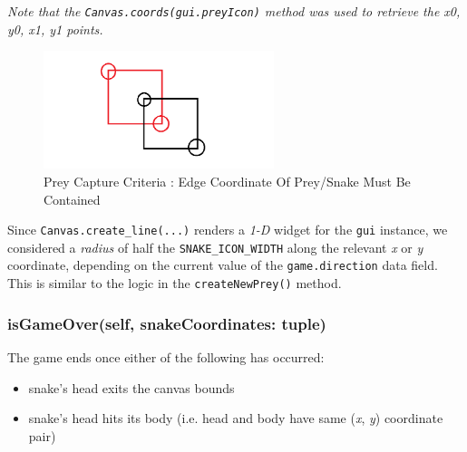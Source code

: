 \documentclass{article}
\begin{document}
\textit{Note that the \texttt{Canvas.coords(gui.preyIcon)} method was used to retrieve the x0, y0, x1, y1 points.}

\begin{figure}[H]
   \centering
    \includegraphics[width=0.6\textwidth]{../PreyCapture.png}
    \caption{Prey Capture Criteria : Edge Coordinate Of Prey/Snake Must Be Contained}
    \label{fig:PreyCapture}
\end{figure}

Since \texttt{Canvas.create\_line(...)} renders a \textit{1-D} widget
for the \texttt{gui} instance, we considered a \textit{radius} of half the \texttt{SNAKE\_ICON\_WIDTH} along the relevant \textit{x} or \textit{y} coordinate, depending on the current value of
the \texttt{game.direction} data field. This is similar to the logic in the \texttt{createNewPrey()} method.

\subsubsection{isGameOver(self, snakeCoordinates: tuple)}\label{sec:Game_Over}
The game ends once either of the following has occurred:
\begin{itemize}
    \item snake's head exits the canvas bounds
    \item snake's head hits its body (i.e. head and body have same (\textit{x}, \textit{y}) coordinate pair)
\end{itemize}
\end{document}
